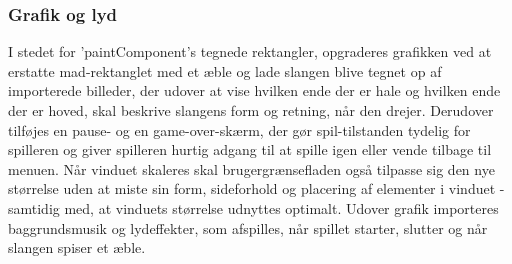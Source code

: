 \subsubsection*{Grafik og lyd}
I stedet for 'paintComponent's tegnede rektangler, opgraderes grafikken ved at erstatte mad-rektanglet med et æble og lade slangen blive tegnet op af importerede billeder, der udover at vise hvilken ende der er hale og hvilken ende der er hoved, skal beskrive slangens form og retning, når den drejer. Derudover tilføjes en pause- og en game-over-skærm, der gør spil-tilstanden tydelig for spilleren og giver spilleren hurtig adgang til at spille igen eller vende tilbage til menuen.
Når vinduet skaleres skal brugergrænsefladen også tilpasse sig den nye størrelse uden at miste sin form, sideforhold og placering af elementer i vinduet - samtidig med, at vinduets størrelse udnyttes optimalt. Udover grafik importeres baggrundsmusik og lydeffekter, som afspilles, når spillet starter, slutter og når slangen spiser et æble.